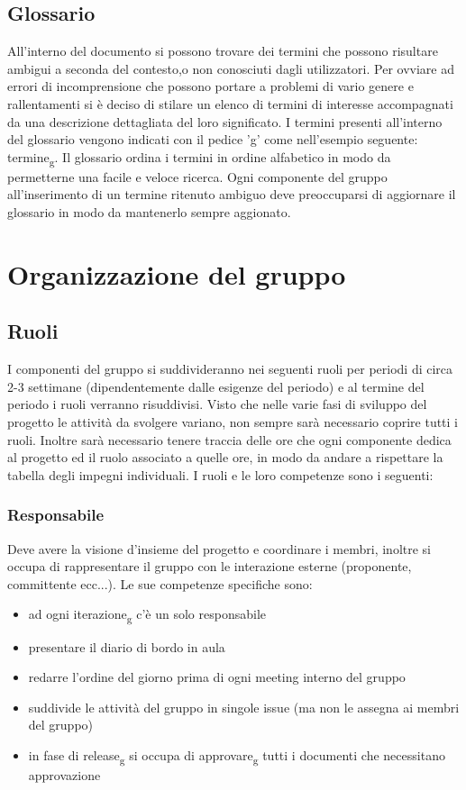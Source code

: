 \subsection{Glossario}
All'interno del documento si possono trovare dei termini che possono risultare ambigui a seconda del contesto,o non conosciuti dagli utilizzatori.
Per ovviare ad errori di incomprensione che possono portare a problemi di vario genere e rallentamenti si è deciso di stilare un elenco di termini 
di interesse accompagnati da una descrizione dettagliata del loro significato.
I termini presenti all'interno del glossario vengono indicati con il pedice 'g' come nell'esempio seguente: termine\textsubscript{g}.
Il glossario ordina i termini in ordine alfabetico in modo da permetterne una facile e veloce ricerca.
Ogni componente del gruppo all'inserimento di un termine ritenuto ambiguo deve preoccuparsi di aggiornare il glossario in modo da mantenerlo sempre aggionato.

\section{Organizzazione del gruppo}
\subsection{Ruoli}
I componenti del gruppo si suddivideranno nei seguenti ruoli per periodi di circa 2-3 settimane (dipendentemente dalle esigenze del periodo) e al termine del periodo i ruoli verranno risuddivisi. 
Visto che nelle varie fasi di sviluppo del progetto le attività da svolgere variano, non sempre sarà necessario coprire tutti i ruoli.
Inoltre sarà necessario tenere traccia delle ore che ogni componente dedica al progetto ed il ruolo associato a quelle ore, in modo da andare a rispettare la tabella degli impegni individuali.
I ruoli e le loro competenze sono i seguenti:

\subsubsection{Responsabile}
Deve avere la visione d'insieme del progetto e coordinare i membri, inoltre si occupa di rappresentare il gruppo con le interazione esterne (proponente, committente ecc...). Le sue competenze specifiche sono:
\begin{itemize}
	\item ad ogni iterazione\textsubscript{g} c'è un solo responsabile
	\item presentare il diario di bordo in aula
	\item redarre l'ordine del giorno prima di ogni meeting interno del gruppo
	\item suddivide le attività del gruppo in singole issue (ma non le assegna ai membri del gruppo)
	\item in fase di release\textsubscript{g} si occupa di approvare\textsubscript{g} tutti i documenti che necessitano approvazione
\end{itemize}

